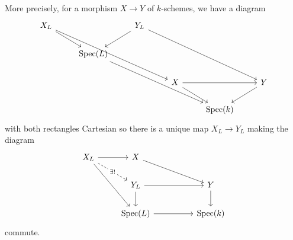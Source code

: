 More precisely, for a morphism $X\to Y$ of $k$-schemes, we have a diagram 
$$%
\begin{tikzcd}
	{X_{L}} && {Y_{L}} \\
	& {\spec(L)} \\
	&&& X && Y \\
	&&&& {\spec(k)}
	\arrow[from=1-1, to=2-2]
	\arrow[from=1-1, to=3-4]
	\arrow[from=1-3, to=2-2]
	\arrow[from=1-3, to=3-6]
	\arrow[from=2-2, to=4-5]
	\arrow[from=3-4, to=3-6]
	\arrow[from=3-4, to=4-5]
	\arrow[from=3-6, to=4-5]
\end{tikzcd}$$
with both rectangles Cartesian so there is a unique map $X_{L}\to Y_{L}$ making the diagram 
$$%
\begin{tikzcd}
	{X_{L}} & X \\
	& {Y_{L}} && Y \\
	& {\spec(L)} && {\spec(k)}
	\arrow[from=1-1, to=1-2]
	\arrow["{\exists!}"{description}, dashed, from=1-1, to=2-2]
	\arrow[from=1-1, to=3-2]
	\arrow[from=1-2, to=2-4]
	\arrow[from=2-2, to=2-4]
	\arrow[from=2-2, to=3-2]
	\arrow[from=2-4, to=3-4]
	\arrow[from=3-2, to=3-4]
\end{tikzcd}$$
commute. 

